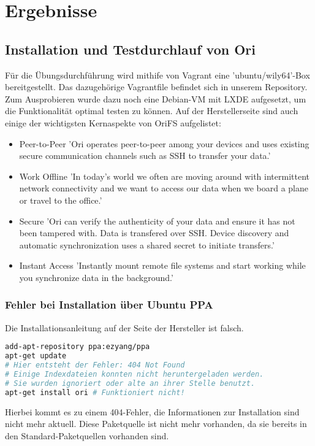 
\section{Ergebnisse}
\label{sec:Ergebnisse}

\subsection{Installation und Testdurchlauf von Ori}
\label{subsec:Installation und Testdurchlauf von Ori}
Für die Übungsdurchführung wird mithife von Vagrant eine 'ubuntu/wily64'-Box bereitgestellt. Das dazugehörige Vagrantfile befindet sich in unserem Repository. \cite{repo} Zum Ausprobieren wurde dazu noch eine Debian-VM mit LXDE aufgesetzt, um die Funktionalität optimal testen zu können. Auf der Herstellerseite sind auch einige der wichtigsten Kernaspekte von OriFS aufgelistet: 

\begin{itemize}
	\item Peer-to-Peer \newline
	'Ori operates peer-to-peer among your devices and uses existing secure communication channels such as SSH to transfer your data.'
	\item Work Offline \newline
	'In today's world we often are moving around with intermittent network connectivity and we want to access our data when we board a plane or travel to the office.'
	\item Secure \newline
	'Ori can verify the authenticity of your data and ensure it has not been tampered with. Data is transfered over SSH. Device discovery and automatic synchronization uses a shared secret to initiate transfers.'
	\item Instant Access \newline
	'Instantly mount remote file systems and start working while you synchronize data in the background.' \cite{OrifsStanford}
\end{itemize}

\subsubsection{Fehler bei Installation über Ubuntu PPA}
\label{subsubsec:Fehler bei Installation über Ubuntu PPA}
Die Installationsanleitung auf der Seite der Hersteller \cite{OrifsStanford} ist falsch. \newline
\begin{lstlisting}[frame=single, language=bash, caption=Anleitung zur Installation laut Hersteller - fehlerhaft]
add-apt-repository ppa:ezyang/ppa
apt-get update
# Hier entsteht der Fehler: 404 Not Found
# Einige Indexdateien konnten nicht heruntergeladen werden. 
# Sie wurden ignoriert oder alte an ihrer Stelle benutzt.
apt-get install ori # Funktioniert nicht!
\end{lstlisting}
Hierbei kommt es zu einem 404-Fehler, die Informationen zur Installation sind nicht mehr aktuell. Diese Paketquelle ist nicht mehr vorhanden, da sie bereits in den Standard-Paketquellen vorhanden sind.

